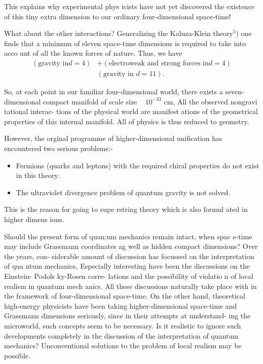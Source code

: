 This explains why experimental phys
icists have not yet discovered the
existence of this
tiny extra dimension to our ordinary
four-dimensional space-time!

What about the other interactions?
Generalizing the Kaluza-Klein theory$^{5}$)
one finds
that a minimum of eleven space-time
dimensions is required to take into acco
unt of all the
known forces of nature. Thus, we have
\begin{align*}
(\text{gravity in} d = 4) &+ (\text{electroweak and strong forces in} d=4)\\
                          & (\text{gravity in } d = 11). 
\end{align*}

So, at each point in our familiar four-dimensional world, there exists a
seven-dimensional
compact manifold of scale size ~
$10^{-33}$ cm, All the observed nongravi
tational interac-
tions of the physical world are manifest
ations of the geometrical properties
of this internal
manifold. All of physics is thus reduced
to geometry.

However, the orginal programme of
higher-dimensional unification has encountered two
serious problems:-
\begin{itemize}
\item Fermions (quarks and leptons) with
the required chiral properties do not
exist in this
theory.
\item  The ultraviolet divergence problem
of quantum gravity is not solved. 
\end{itemize}

This is the reason for going to supe
rstring theory which is also formul
ated in higher dimens
ions.

Should the present form of quan;um
mechanics remain intact, when spac
e-time may
include Grassmann coordinates ag well
as hidden compact dimensions? Over
the years, con-
siderable amount of discussion has
focussed on the interpretation of qua
ntum mechanics,
Especially interesting have been the
discussions on the Einstein- Podols
ky-Rosen corre-
lations and the possibility of violatio
n of local realism in quantum mech
anics. All these
discussions naturally take place with
in the framework of four-dimensional
space-time. On the other hand, theoretical high-energy physicists have been taking higher-dimensional
space-time and Grassmann dimensions seriously, since in their attempts at understand-
ing the microworld, such concepts seem to be necessary.
Is it realistic to ignore such
developments completely in the discussion of the interpretation of quantum mechanics?
Unconventional solutions to the problem of local realism may be possible.


